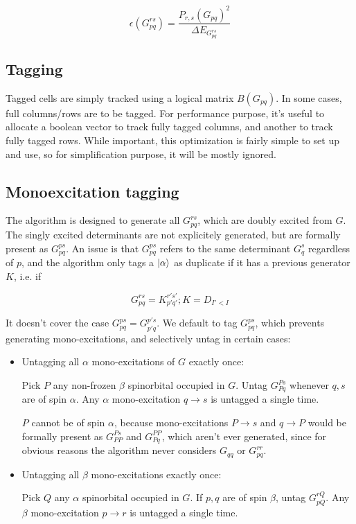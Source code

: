 \documentclass[./thesis.tex]{subfiles}
\begin{document}
\begin{itemize}
\begin{equation}
\epsilon(G_{pq}^{rs}) = \frac{P_{r,s}(G_{pq})^2}{\Delta E_{G^{rs}_{pq}}}
\end{equation}

\end{itemize}


\subsection{Tagging}

Tagged cells are simply tracked using a logical matrix $B(G_{pq})$.
In some cases, full columns/rows are to be tagged. For performance purpose, it's useful to allocate a boolean vector to track fully tagged columns, and another to track fully tagged rows. While important, this optimization is fairly simple to set up and use, so for simplification purpose, it will be mostly ignored.


\subsection{Monoexcitation tagging}

The algorithm is designed to generate all $G_{pq}^{rs}$, which are doubly excited from $G$. The singly excited determinants are not explicitely generated, but are formally present as $G_{pq}^{ps}$.
An issue is that $G_{pq}^{ps}$ refers to the same determinant $G_q^s$ regardless of $p$, and the algorithm only tags a $\ket \alpha$ as duplicate if it has a previous generator $K$, i.e. if

\begin{equation}
G_{pq}^{rs} = {K}_{p'q'}^{r's'} ; K = D_{I'<I}
\end{equation}

It doesn't cover the case $G_{pq}^{ps} = G_{p'q}^{p's}$.
We default to tag $G_{pq}^{ps}$, which prevents generating mono-excitations, and selectively untag in certain cases:


\begin{itemize}
\item
Untagging all $\alpha$ mono-excitations of $G$ exactly once:

Pick $P$ any non-frozen $\beta$ spinorbital occupied in $G$. Untag $G_{Pq}^{Ps}$ whenever $q,s$ are of spin $\alpha$. Any $\alpha$ mono-excitation $q \rightarrow  s$ is untagged a single time.

$P$ cannot be of spin $\alpha$, because mono-excitations $P \rightarrow  s$ and $q \rightarrow  P$ would be formally present as $G_{PP}^{Ps}$ and $G_{Pq}^{PP}$, which aren't ever generated, since for obvious reasons the algorithm never considers $G_{qq}$ or $G_{pq}^{rr}$.
\item
Untagging all $\beta$ mono-excitations exactly once:

Pick $Q$ any $\alpha$ spinorbital occupied in $G$. If $p,q$ are of spin $\beta$, untag $G_{pQ}^{rQ}$. Any $\beta$ mono-excitation $p \rightarrow  r$ is untagged a single time.
\end{itemize}
\end{document}
